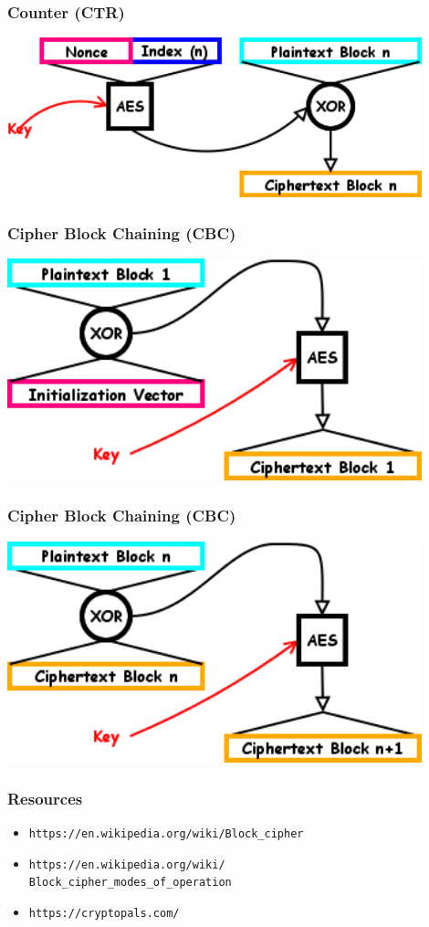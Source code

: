\documentclass{beamer}
\begin{document}
\begin{frame}[fragile]
\frametitle{Counter (CTR)}
\includegraphics[width=0.9\textwidth]{diagram_images/CTR.png}\\
\end{frame}

\begin{frame}[fragile]
\frametitle{Cipher Block Chaining (CBC)}
\includegraphics[width=0.9\textwidth]{diagram_images/CBC.png}\\
\end{frame}

\begin{frame}[fragile]
\frametitle{Cipher Block Chaining (CBC)}
\includegraphics[width=0.9\textwidth]{diagram_images/CBC_Induction.png}\\
\end{frame}

\begin{frame}[fragile]
\frametitle{Resources}
\begin{itemize}
\item \verb|https://en.wikipedia.org/wiki/Block_cipher|
\item \verb|https://en.wikipedia.org/wiki/|\\\verb|Block_cipher_modes_of_operation|
\item \verb|https://cryptopals.com/|
\end{itemize}
\end{frame}
\end{document}
